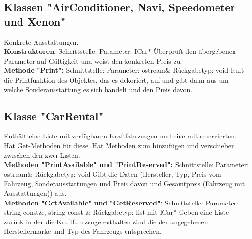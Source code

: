 \documentclass[12pt,a4paper]{article}
\begin{document}
\subsection {Klassen "AirConditioner, Navi, Speedometer und Xenon"}
Konkrete Ausstattungen.
\\

\textbf {Konstruktoren: } 
\newline
Schnittstelle: 
\newline
Parameter: ICar*
\newline
Überprüft den übergebenen Parameter auf Gültigkeit und weist den konkreten Preis zu.
\\

\textbf {Methode "Print": } 
\newline
Schnittstelle:
\newline
Parameter: ostream\&
\newline
Rückgabetyp: void
\newline
Ruft die Printfunktion des Objektes, das es dekoriert, auf und gibt dann aus um welche Sonderausstattung es sich handelt und den Preis davon.
\\

\subsection {Klasse "CarRental"}
Enthält eine Liste mit verfügbaren Kraftfahrzeugen und eine mit reservierten. Hat Get-Methoden für diese. Hat Methoden zum hinzufügen und verschieben zwischen den zwei Listen.
\\

\textbf {Methoden "PrintAvailable" und "PrintReserved": } 
\newline
Schnittstelle:
\newline
Parameter: ostream\&
\newline
Rückgabetyp: void
\newline
Gibt die Daten (Hersteller, Typ, Preis vom Fahrzeug, Sonderausstattungen und Preis davon und Gesamtpreis (Fahrzeug mit Ausstattungen)) aus.
\\

\textbf {Methoden "GetAvailable" und "GetReserved": } 
\newline
Schnittstelle:
\newline
Parameter: string const\&, string const \&
\newline
Rückgabetyp: list mit ICar*
\newline
Geben eine Liste zurück in der die Kraftfahrzeuge enthalten sind die der angegebenen Herstellermarke und Typ des Fahrzeugs entsprechen.
\\
\end{document}
